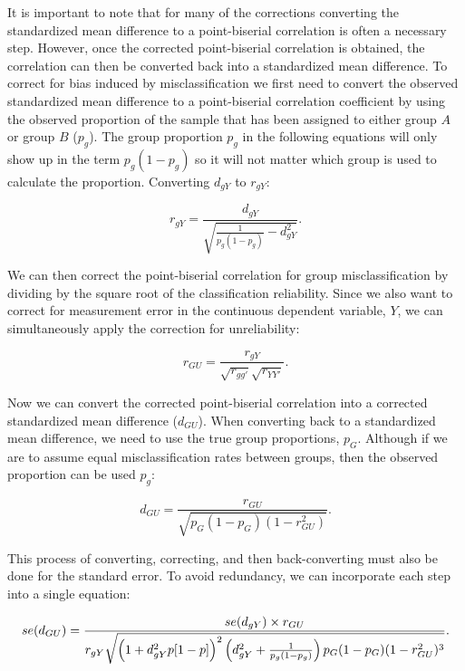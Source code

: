 \documentclass[
  letterpaper,
  DIV=11,
  numbers=noendperiod]{scrreprt}
\begin{document}
It is important to note that for many of the corrections converting the
standardized mean difference to a point-biserial correlation is often a
necessary step. However, once the corrected point-biserial correlation
is obtained, the correlation can then be converted back into a
standardized mean difference. To correct for bias induced by
misclassification we first need to convert the observed standardized
mean difference to a point-biserial correlation coefficient by using the
observed proportion of the sample that has been assigned to either group
\(A\) or group \(B\) (\(p_g\)). The group proportion \(p_g\) in the
following equations will only show up in the term \(p_g(1-p_g)\) so it
will not matter which group is used to calculate the proportion.
Converting \(d_{gY}\) to \(r_{gY}\):

\[
r_{gY} = \frac{d_{gY}}{\sqrt{\frac{1}{p_g(1-p_g)}-d_{gY}^2}}.
\]

We can then correct the point-biserial correlation for group
misclassification by dividing by the square root of the classification
reliability. Since we also want to correct for measurement error in the
continuous dependent variable, \(Y\), we can simultaneously apply the
correction for unreliability:

\[
r_{GU} = \frac{r_{gY}}{\sqrt{r_{gg'}}\sqrt{r_{YY'}}}.
\]

Now we can convert the corrected point-biserial correlation into a
corrected standardized mean difference (\(d_{GU}\)). When converting
back to a standardized mean difference, we need to use the true group
proportions, \(p_G\). Although if we are to assume equal
misclassification rates between groups, then the observed proportion can
be used \(p_g\):

\[
d_{GU} = \frac{r_{GU}}{\sqrt{p_G\left(1-p_G\right)\left(1-r_{GU}^2\right)}}.
\]

This process of converting, correcting, and then back-converting must
also be done for the standard error. To avoid redundancy, we can
incorporate each step into a single equation:

\[
\small{se(d_{GU}) = \frac {se(d_{gY})\times r_{GU}} {r_{gY}\sqrt{\left(1+d_{gY}^2p[1-p]\right)^2\left(d_{gY}^2+\frac{1}{p_g(1-p_g)}\right)p_G(1-p_G)(1-r_{GU}^2)^3}}.}
\]
\end{document}
